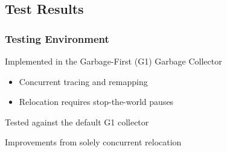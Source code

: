 \documentclass{beamer}
\newcommand{\linespace}{\vskip 0.25cm}
\begin{document}
\subsection*{Test Results}

\begin{frame}

\frametitle{Testing Environment}

Implemented in the Garbage-First (G1) Garbage Collector
\begin{itemize}
\item Concurrent tracing and remapping
\item Relocation requires stop-the-world pauses
\end{itemize}

\linespace
\linespace

Tested against the default G1 collector

\linespace
\linespace

Improvements from solely concurrent relocation

\end{frame}
\end{document}

